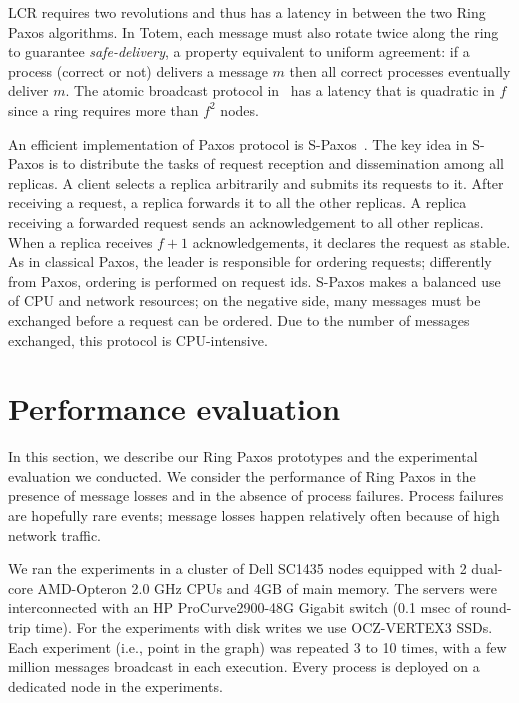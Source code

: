 \documentclass[final,3p,times,twocolumn,authoryear]{elsarticle}
\begin{document}
LCR requires two revolutions and thus has a latency in between the two Ring Paxos algorithms. In Totem, each message must also rotate twice along the ring to guarantee \emph{safe-delivery}, a property equivalent to uniform agreement: if a process (correct or 
not) delivers a message $m$ then all correct processes eventually deliver $m$. 
The atomic broadcast protocol in~\cite{ESU04} has a latency that is quadratic in $f$ since a ring requires more than $f^2$ nodes.

An efficient implementation of Paxos protocol is S-Paxos~\cite{spaxos}. The key idea in S-Paxos is to distribute the tasks of request reception and dissemination among all replicas. A client selects a replica arbitrarily and submits its requests to it. After receiving a request, a replica forwards it to all the other replicas. A replica receiving a forwarded request sends an acknowledgement to all other replicas. When a replica receives $f+1$ acknowledgements, it declares the request as stable. As in classical Paxos, the leader is responsible for ordering requests; differently from Paxos, ordering is performed on request ids. S-Paxos makes a balanced use of CPU and network resources; on the negative side, many messages must be exchanged before a request can be ordered. Due to the number of messages exchanged, this protocol is CPU-intensive. 



\section{Performance evaluation}
\label{sec:perf}

In this section, we describe our Ring Paxos prototypes and the experimental evaluation we conducted. We consider the performance of Ring Paxos in the presence of message losses and in the absence of process failures. Process failures are hopefully rare events; message losses happen relatively often because of high network traffic.

We ran the experiments in a cluster of Dell SC1435 nodes equipped with 2 dual-core AMD-Opteron 2.0 GHz CPUs and 4GB of main memory. The servers were interconnected with an HP ProCurve2900-48G Gigabit switch (0.1 msec of round-trip time). For the experiments with disk writes we use OCZ-VERTEX3 SSDs. Each experiment (i.e., point in the graph) was repeated 3 to 10 times, with a few million messages broadcast in each execution. Every process is deployed on a dedicated node in the experiments.  
\end{document}

